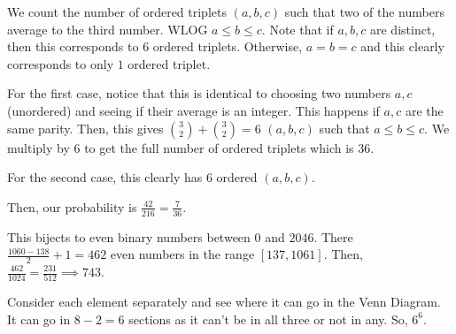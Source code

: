 \documentclass[11pt]{article}
\begin{document}
\begin{sol} 
We count the number of ordered triplets $(a,b,c)$ such that two of the numbers average to the third number. WLOG $a\leq b\leq c$. Note that if $a,b,c$ are distinct, then this corresponds to $6$ ordered triplets. Otherwise, $a=b=c$ and this clearly corresponds to only $1$ ordered triplet.

For the first case, notice that this is identical to choosing two numbers $a,c$ (unordered) and seeing if their average is an integer. This happens if $a,c$ are the same parity. Then, this gives $\binom{3}{2} + \binom{3}{2}=6$ $(a,b,c)$ such that $a\leq b\leq c$. We multiply by $6$ to get the full number of ordered triplets which is $36$.

For the second case, this clearly has $6$ ordered $(a,b,c)$.

Then, our probability is $\frac{42}{216}=\boxed{\frac{7}{36}}$.
\end{sol}


\begin{sol} 
This bijects to even binary numbers between $0$ and $2046$. There $\frac{1060-138}{2}+1=462$ even numbers in the range $[137,1061]$. Then, $\frac{462}{1024}=\frac{231}{512}\implies \boxed{743}$.
\end{sol}


\begin{sol}
Consider each element separately and see where it can go in the Venn Diagram. It can go in $8-2=6$ sections as it can't be in all three or not in any. So, $\boxed{6^6}$.
\end{sol}
\end{document}

